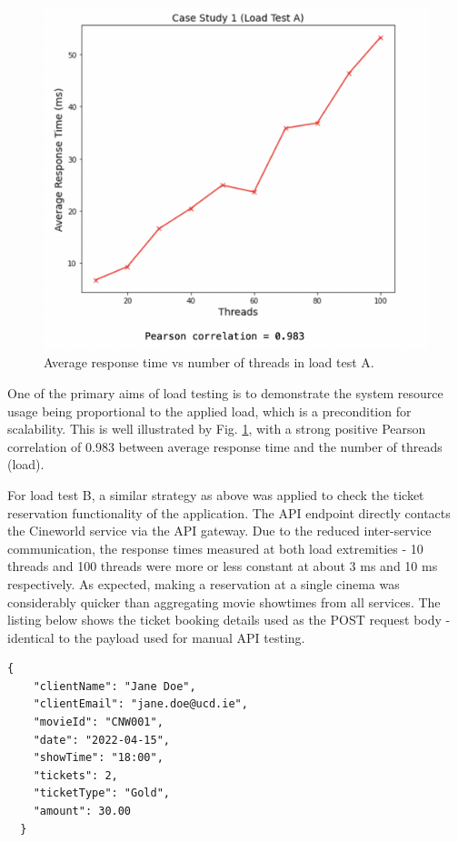 \begin{figure}[H]
  \centering
  \includegraphics[width=0.55\linewidth]{./assets/images/case-studies/cs01-lta-4.png}
  \caption{Average response time vs number of threads in load test A.}
  \label{fig:cs01-lta-4}
\end{figure}

One of the primary aims of load testing is to demonstrate the system resource usage being proportional to the applied load, which is a precondition for scalability. This is well illustrated by Fig. \ref{fig:cs01-lta-4}, with a strong positive Pearson correlation of 0.983 between average response time and the number of threads (load).

For load test B, a similar strategy as above was applied to check the ticket reservation functionality of the application. The API endpoint  directly contacts the Cineworld service via the API gateway. Due to the reduced inter-service communication, the response times measured at both load extremities - 10 threads and 100 threads were more or less constant at about 3 ms and 10 ms respectively. As expected, making a reservation at a single cinema was considerably quicker than aggregating movie showtimes from all services. The listing below shows the ticket booking details used as the POST request body - identical to the payload used for manual API testing.

\begin{lstlisting}[caption=Dummy payload for load test B POST request.]
  {
    "clientName": "Jane Doe",
    "clientEmail": "jane.doe@ucd.ie",
    "movieId": "CNW001",
    "date": "2022-04-15",
    "showTime": "18:00",
    "tickets": 2,
    "ticketType": "Gold",
    "amount": 30.00
  }
\end{lstlisting}



